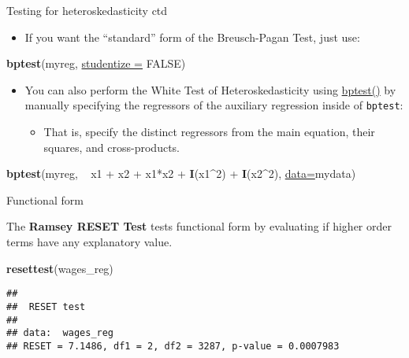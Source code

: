 \documentclass[ignorenonframetext,]{beamer}
\newenvironment{Shaded}{\begin{snugshade}}{\end{snugshade}}
\newcommand{\KeywordTok}[1]{\textcolor[rgb]{0.26,0.66,0.93}{\textbf{#1}}}
\newcommand{\DataTypeTok}[1]{\textcolor[rgb]{0.74,0.68,0.62}{\underline{#1}}}
\newcommand{\DecValTok}[1]{\textcolor[rgb]{0.27,0.67,0.26}{#1}}
\newcommand{\StringTok}[1]{\textcolor[rgb]{0.02,0.61,0.04}{#1}}
\newcommand{\OtherTok}[1]{\textcolor[rgb]{0.74,0.68,0.62}{#1}}
\newcommand{\OperatorTok}[1]{\textcolor[rgb]{0.74,0.68,0.62}{#1}}
\newcommand{\NormalTok}[1]{\textcolor[rgb]{0.74,0.68,0.62}{#1}}
\providecommand{\tightlist}{%
  \setlength{\itemsep}{0pt}\setlength{\parskip}{0pt}}
\begin{document}
\begin{frame}[fragile]{Testing for heteroskedasticity ctd}

\begin{itemize}
\tightlist
\item
  If you want the ``standard'' form of the Breusch-Pagan Test, just use:
\end{itemize}

\begin{Shaded}
\begin{Highlighting}[]
\KeywordTok{bptest}\NormalTok{(myreg, }\DataTypeTok{studentize =} \OtherTok{FALSE}\NormalTok{)}
\end{Highlighting}
\end{Shaded}

\begin{itemize}
\item
  You can also perform the White Test of Heteroskedasticity using
  \href{https://www.rdocumentation.org/packages/lmtest/versions/0.9-35/topics/bptest}{bptest()}
  by manually specifying the regressors of the auxiliary regression
  inside of \texttt{bptest}:

  \begin{itemize}
  \tightlist
  \item
    That is, specify the distinct regressors from the main equation,
    their squares, and cross-products.
  \end{itemize}
\end{itemize}

\begin{Shaded}
\begin{Highlighting}[]
\KeywordTok{bptest}\NormalTok{(myreg, }\OperatorTok{~}\StringTok{ }\NormalTok{x1 }\OperatorTok{+}\StringTok{ }\NormalTok{x2 }\OperatorTok{+}\StringTok{ }\NormalTok{x1}\OperatorTok{*}\NormalTok{x2 }\OperatorTok{+}\StringTok{ }\KeywordTok{I}\NormalTok{(x1}\OperatorTok{^}\DecValTok{2}\NormalTok{) }\OperatorTok{+}\StringTok{ }
\StringTok{         }\KeywordTok{I}\NormalTok{(x2}\OperatorTok{^}\DecValTok{2}\NormalTok{), }\DataTypeTok{data=}\NormalTok{mydata)}
\end{Highlighting}
\end{Shaded}

\end{frame}

\begin{frame}[fragile]{Functional form}

The \textbf{Ramsey RESET Test} tests functional form by evaluating if
higher order terms have any explanatory value.

\begin{Shaded}
\begin{Highlighting}[]
\KeywordTok{resettest}\NormalTok{(wages_reg)}
\end{Highlighting}
\end{Shaded}

\begin{verbatim}
## 
##  RESET test
## 
## data:  wages_reg
## RESET = 7.1486, df1 = 2, df2 = 3287, p-value = 0.0007983
\end{verbatim}

\end{frame}
\end{document}
